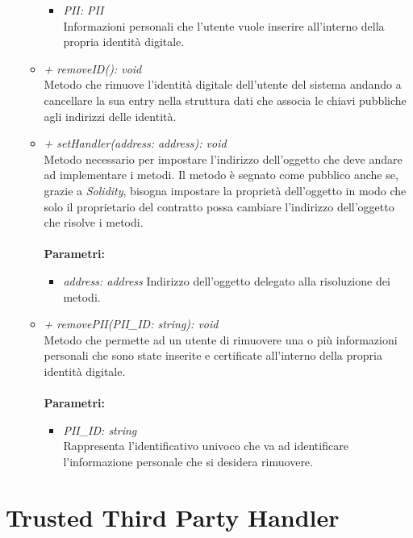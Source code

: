 \begin{itemize}
\begin{itemize}
\begin{itemize}
			\item \textit{PII: PII}\\
			Informazioni personali che l'utente vuole inserire all'interno della propria identità digitale.
		\end{itemize}
		\item \textit{+ removeID(): void}\\
		Metodo che rimuove l'identità digitale dell'utente del sistema andando a cancellare la sua entry nella struttura dati che associa le chiavi pubbliche agli indirizzi delle identità.
		\item \textit{+ setHandler(address: address): void}\\
		Metodo necessario per impostare l'indirizzo dell'oggetto che deve andare ad implementare i metodi. Il metodo è segnato come pubblico anche se, grazie a \textit{Solidity}, bisogna impostare la proprietà dell'oggetto in modo che solo il proprietario del contratto possa cambiare l'indirizzo dell'oggetto che risolve i metodi.\\\\
		\textbf{Parametri:}
		\begin{itemize}
			\item \textit{address: address}
			Indirizzo dell'oggetto delegato alla risoluzione dei metodi.
		\end{itemize}
		\item \textit{+ removePII(PII\_ID: string): void}\\
		Metodo che permette ad un utente di rimuovere una o più informazioni personali che sono state inserite e certificate all'interno della propria identità digitale.\\\\
		\textbf{Parametri:}
		\begin{itemize}
			\item \textit{PII\_ID: string}\\
			Rappresenta l'identificativo univoco che va ad identificare l'informazione personale che si desidera rimuovere.
		\end{itemize}
	\end{itemize}
\end{itemize}
\section{Trusted Third Party Handler}
